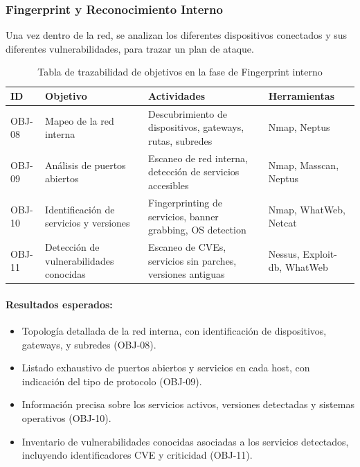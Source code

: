 \documentclass[a4paper, 10pt]{article}
\begin{document}
\clearpage

\subsubsection{Fingerprint y Reconocimiento Interno}

Una vez dentro de la red, se analizan los diferentes dispositivos conectados y sus diferentes vulnerabilidades, para trazar un plan de ataque.

\begin{table}[H]
\centering
\renewcommand{\arraystretch}{1.4}
    \begin{tabular}{|p{1.2cm}|p{3.9cm}|p{5.3cm}|p{4.2cm}|}
\hline
\textbf{ID} & \textbf{Objetivo} & \textbf{Actividades} & \textbf{Herramientas}  \\
\hline
OBJ-08 & Mapeo de la red interna & Descubrimiento de dispositivos, gateways, rutas, subredes & Nmap, Neptus  \\
\hline
OBJ-09 & Análisis de puertos abiertos & Escaneo de red interna, detección de servicios accesibles & Nmap, Masscan, Neptus  \\
\hline
OBJ-10 & Identificación de servicios y versiones & Fingerprinting de servicios, banner grabbing, OS detection & Nmap, WhatWeb, Netcat  \\
\hline
OBJ-11 & Detección de vulnerabilidades conocidas & Escaneo de CVEs, servicios sin parches, versiones antiguas & Nessus, Exploit-db, WhatWeb  \\
\hline

\end{tabular}
\caption{Tabla de trazabilidad de objetivos en la fase de Fingerprint interno}
\end{table}



\paragraph{Resultados esperados:}
\begin{itemize}
    \item Topología detallada de la red interna, con identificación de dispositivos, gateways, y subredes (OBJ-08).
    \item Listado exhaustivo de puertos abiertos y servicios en cada host, con indicación del tipo de protocolo (OBJ-09).
    \item Información precisa sobre los servicios activos, versiones detectadas y sistemas operativos (OBJ-10).
    \item Inventario de vulnerabilidades conocidas asociadas a los servicios detectados, incluyendo identificadores CVE y criticidad (OBJ-11).
\end{itemize}
\end{document}
